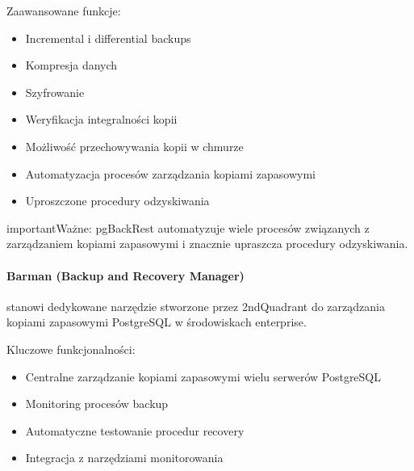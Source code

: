 \documentclass[letterpaper,10pt,polish]{sphinxmanual}
\begin{document}
\sphinxAtStartPar
Zaawansowane funkcje:
\begin{itemize}
\item {} 
\sphinxAtStartPar
Incremental i differential backups

\item {} 
\sphinxAtStartPar
Kompresja danych

\item {} 
\sphinxAtStartPar
Szyfrowanie

\item {} 
\sphinxAtStartPar
Weryfikacja integralności kopii

\item {} 
\sphinxAtStartPar
Możliwość przechowywania kopii w chmurze

\item {} 
\sphinxAtStartPar
Automatyzacja procesów zarządzania kopiami zapasowymi

\item {} 
\sphinxAtStartPar
Uproszczone procedury odzyskiwania

\end{itemize}

\begin{sphinxadmonition}{important}{Ważne:}
\sphinxAtStartPar
pgBackRest automatyzuje wiele procesów związanych z zarządzaniem kopiami zapasowymi i znacznie upraszcza procedury odzyskiwania.
\end{sphinxadmonition}


\paragraph{Barman (Backup and Recovery Manager)}
\label{\detokenize{rozdzial2/Kopie_zapasowe_i_odzyskiwanie_danych/kopie_zapasowe_i_odzyskiwanie_danych:barman-backup-and-recovery-manager}}
\sphinxAtStartPar
{} stanowi dedykowane narzędzie stworzone przez 2ndQuadrant do zarządzania kopiami zapasowymi PostgreSQL w środowiskach enterprise.

\sphinxAtStartPar
Kluczowe funkcjonalności:
\begin{itemize}
\item {} 
\sphinxAtStartPar
Centralne zarządzanie kopiami zapasowymi wielu serwerów PostgreSQL

\item {} 
\sphinxAtStartPar
Monitoring procesów backup

\item {} 
\sphinxAtStartPar
Automatyczne testowanie procedur recovery

\item {} 
\sphinxAtStartPar
Integracja z narzędziami monitorowania

\end{itemize}
\end{document}
